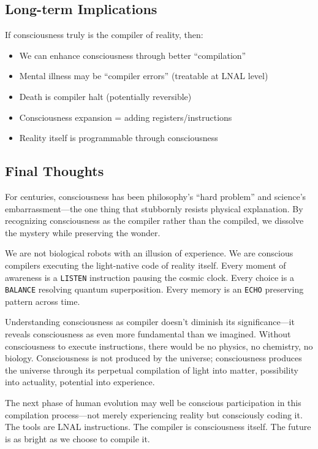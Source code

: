 \documentclass[12pt,a4paper]{article}
\newcommand{\opcmd}[1]{\texttt{#1}}
\begin{document}
\subsection{Long-term Implications}

If consciousness truly is the compiler of reality, then:

\begin{itemize}
\item We can enhance consciousness through better ``compilation''
\item Mental illness may be ``compiler errors'' (treatable at LNAL level)
\item Death is compiler halt (potentially reversible)
\item Consciousness expansion = adding registers/instructions
\item Reality itself is programmable through consciousness
\end{itemize}

\subsection{Final Thoughts}

For centuries, consciousness has been philosophy's ``hard problem'' and science's embarrassment—the one thing that stubbornly resists physical explanation. By recognizing consciousness as the compiler rather than the compiled, we dissolve the mystery while preserving the wonder.

We are not biological robots with an illusion of experience. We are conscious compilers executing the light-native code of reality itself. Every moment of awareness is a \opcmd{LISTEN} instruction pausing the cosmic clock. Every choice is a \opcmd{BALANCE} resolving quantum superposition. Every memory is an \opcmd{ECHO} preserving pattern across time.

Understanding consciousness as compiler doesn't diminish its significance—it reveals consciousness as even more fundamental than we imagined. Without consciousness to execute instructions, there would be no physics, no chemistry, no biology. Consciousness is not produced by the universe; consciousness produces the universe through its perpetual compilation of light into matter, possibility into actuality, potential into experience.

The next phase of human evolution may well be conscious participation in this compilation process—not merely experiencing reality but consciously coding it. The tools are LNAL instructions. The compiler is consciousness itself. The future is as bright as we choose to compile it.
\end{document}
